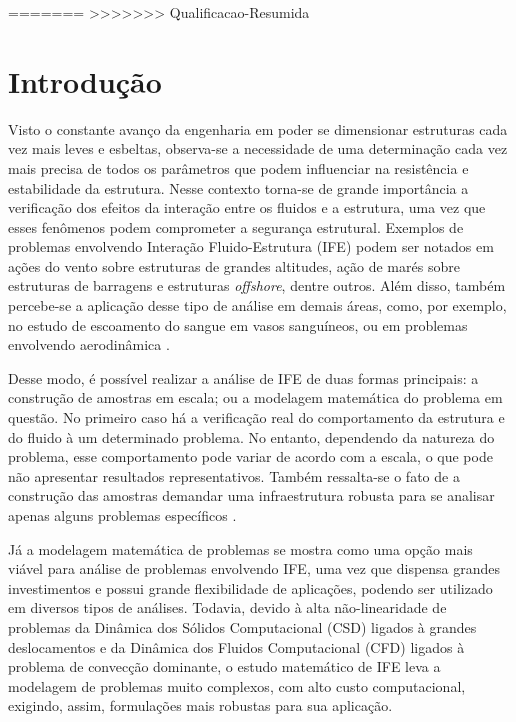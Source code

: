 \documentclass[_ArquivoPrincipal.tex]{subfiles}
\begin{document}
=======
>>>>>>> Qualificacao-Resumida
\chapter{Introdução}

Visto o constante avanço da engenharia em poder se dimensionar estruturas cada vez mais leves e esbeltas, observa-se a necessidade de uma determinação cada vez mais precisa de todos os parâmetros que podem influenciar na resistência e estabilidade da estrutura. Nesse contexto torna-se de grande importância a verificação dos efeitos da interação entre os fluidos e a estrutura, uma vez que esses fenômenos podem comprometer a segurança estrutural. Exemplos de problemas envolvendo Interação Fluido-Estrutura (IFE) podem ser notados em ações do vento sobre estruturas de grandes altitudes, ação de marés sobre estruturas de barragens e estruturas \textit{offshore}, dentre outros. Além disso, também percebe-se a aplicação desse tipo de análise em demais áreas, como, por exemplo, no estudo de escoamento do sangue em vasos sanguíneos, ou em problemas envolvendo aerodinâmica \cite{sanches2014fluid, fernandes2020tecnica}.

Desse modo, é possível realizar a análise de IFE de duas formas principais: a construção de amostras em escala; ou a modelagem matemática do problema em questão. No primeiro caso há a verificação real do comportamento da estrutura e do fluido à um determinado problema. No entanto, dependendo da natureza do problema, esse comportamento pode variar de acordo com a escala, o que pode não apresentar resultados representativos. Também ressalta-se o fato de a construção das amostras demandar uma infraestrutura robusta para se analisar apenas alguns problemas específicos \cite{fernandes2020tecnica}.

Já a modelagem matemática de problemas se mostra como uma opção mais viável para análise de problemas envolvendo IFE, uma vez que dispensa grandes investimentos e possui grande flexibilidade de aplicações, podendo ser utilizado em diversos tipos de análises. Todavia, devido à alta não-linearidade de problemas da Dinâmica dos Sólidos Computacional (CSD) ligados à grandes deslocamentos e da Dinâmica dos Fluidos Computacional (CFD) ligados à problema de convecção dominante, o estudo matemático de IFE leva a modelagem de problemas muito complexos, com alto custo computacional, exigindo, assim, formulações mais robustas para sua aplicação.
\end{document}
